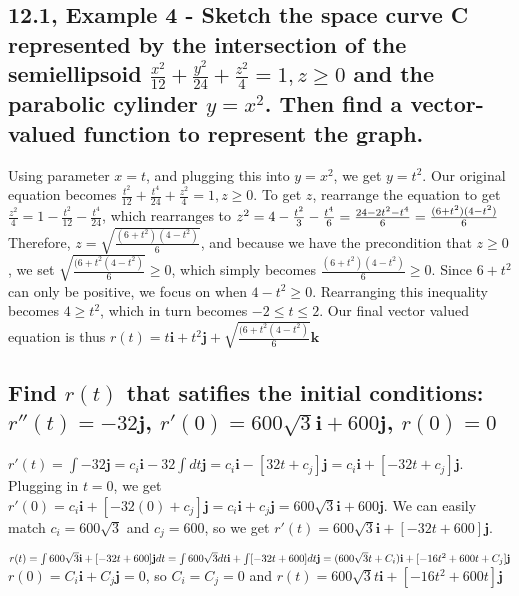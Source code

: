 \documentclass{article}
\begin{document}
\subsection{12.1, Example 4 - Sketch the space curve C represented by the intersection of the semiellipsoid $\frac{x^{2}}{12} + \frac{y^{2}}{24} + \frac{z^{2}}{4} = 1, z \geq 0$ and the parabolic cylinder $y = x^{2}$.  Then find a vector-valued function to represent the graph.}
\par\noindent\Large Using parameter $x = t$, and plugging this into $y = x^{2}$, we get $y = t^{2}$.  Our original equation becomes $\frac{t^{2}}{12} + \frac{t^{4}}{24} + \frac{z^{2}}{4} = 1, z \geq 0$.  To get $z$, rearrange the equation to get $\frac{z^{2}}{4} = 1 - \frac{t^{2}}{12} - \frac{t^{4}}{24}$, which rearranges to $z^{2} = 4 - \frac{t^{2}}{3} - \frac{t^{4}}{6} = \frac{24 - 2t^{2} - t^{4}}{6} = \frac{(6 + t^{2})(4 - t^{2})}{6}\linebreak$  Therefore, $z = \sqrt{\frac{(6 + t^{2})(4 - t^{2})}{6}}$, and because we have the precondition that $z \geq 0$, we set $\sqrt{\frac{(6 + t^{2}(4 - t^{2})}{6}} \geq 0$, which simply becomes $\frac{(6 + t^{2})(4 - t^{2})}{6} \geq 0$.  Since $6 + t^{2}$ can only be positive, we focus on when $4 - t^{2} \geq 0$.  Rearranging this inequality becomes $4 \geq t^{2}$, which in turn becomes $-2 \leq t \leq 2$.  Our final vector valued equation is thus $r(t) = t\textbf{i} + t^{2}\textbf{j} + \sqrt{\frac{(6 + t^{2}(4 - t^{2})}{6}}\textbf{k}$

\subsection{Find $r(t)$ that satifies the initial conditions: $r''(t) = -32\textbf{j}$, $r'(0) = 600\sqrt{3}\textbf{i} + 600\textbf{j}$, $r(0) = 0$}
\par\noindent\large $r'(t) = \int -32\textbf{j} = c_{i}\textbf{i} -32\int dt\textbf{j} = c_{i}\textbf{i} - [32t + c_{j}]\textbf{j} = c_{i}\textbf{i} + [-32t + c_{j}]\textbf{j}$.  Plugging in $t = 0$, we get $r'(0) = c_{i}\textbf{i} + [-32(0) + c_{j}]\textbf{j} = c_{i}\textbf{i} + c_{j}\textbf{j} = 600\sqrt{3}\textbf{i} + 600\textbf{j}$.  We can easily match $c_{i} = 600\sqrt{3}$ and $c_{j} = 600$, so we get $r'(t) = 600\sqrt{3}\textbf{i} + [-32t + 600]\textbf{j}$.\vspace{0.25cm}

\par\noindent\large $r(t) = \int 600\sqrt{3}\textbf{i} + [-32t + 600]\textbf{j} dt = \int 600\sqrt{3}dt\textbf{i} + \int [-32t + 600]dt\textbf{j} = (600\sqrt{3}t + C_{i})\textbf{i} + [-16t^{2} + 600t + C_{j}]\textbf{j}\linebreak$
$r(0) = C_{i}\textbf{i} + C_{j}\textbf{j} = 0$, so $C_{i} = C_{j} = 0$ and $r(t) = 600\sqrt{3}t\textbf{i} + [-16t^{2} + 600{t}]\textbf{j}$
\end{document}
